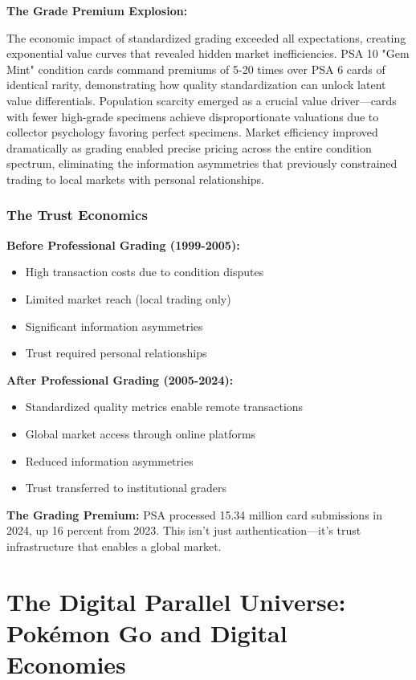 \documentclass[11pt,oneside]{book}
\begin{document}
{{{{{{\textbf{The Grade Premium Explosion:}

The economic impact of standardized grading exceeded all expectations, creating exponential value curves that revealed hidden market inefficiencies. PSA 10 "Gem Mint" condition cards command premiums of 5-20 times over PSA 6 cards of identical rarity, demonstrating how quality standardization can unlock latent value differentials. Population scarcity emerged as a crucial value driver—cards with fewer high-grade specimens achieve disproportionate valuations due to collector psychology favoring perfect specimens. Market efficiency improved dramatically as grading enabled precise pricing across the entire condition spectrum, eliminating the information asymmetries that previously constrained trading to local markets with personal relationships.

\subsubsection{The Trust Economics}

\textbf{Before Professional Grading (1999-2005):}
\begin{itemize}
\item High transaction costs due to condition disputes
\item Limited market reach (local trading only)
\item Significant information asymmetries
\item Trust required personal relationships
\end{itemize}

\textbf{After Professional Grading (2005-2024):}
\begin{itemize}
\item Standardized quality metrics enable remote transactions
\item Global market access through online platforms
\item Reduced information asymmetries
\item Trust transferred to institutional graders
\end{itemize}

\textbf{The Grading Premium:} PSA processed 15.34 million card submissions in 2024, up 16 percent from 2023. This isn't just authentication—it's trust infrastructure that enables a global market.

\section{The Digital Parallel Universe: Pokémon Go and Digital Economies}

}}}}}}
\end{document}
